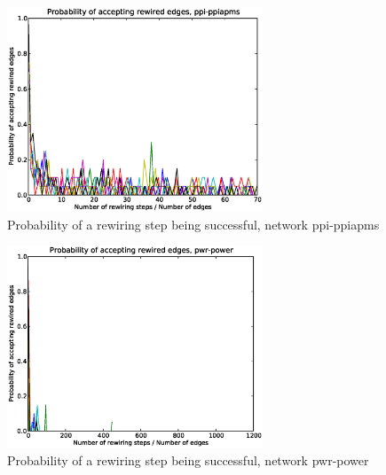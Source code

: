 \begin{figure}[p]
\centering
\includegraphics[width=3in]{Figures/Paccept-ppi-ppiapms.eps}
\caption{Probability of a rewiring step being successful, network ppi-ppiapms}
\label{fig:Paccept-ppi-ppiapms}
\end{figure}

\begin{figure}[p]
\centering
\includegraphics[width=3in]{Figures/Paccept-pwr-power.eps}
\caption{Probability of a rewiring step being successful, network pwr-power}
\label{fig:Paccept-pwr-power}
\end{figure}
